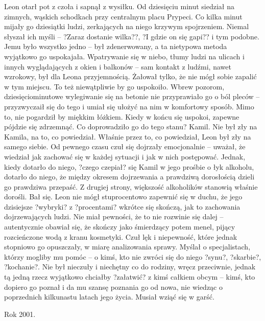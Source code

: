 \documentclass[../MAIN.tex]{subfiles}
\begin{document}
Leon otarł pot z czoła i sapnął z wysiłku.
Od dziesięciu minut siedział na zimnych, wąskich schodkach przy centralnym placu Prypeci. Co kilka minut mijały go dziesiątki ludzi, zerkających na niego krzywym spojrzeniem. Niemal słyszał ich myśli -- ?Zaraz dostanie wilka??, ?I gdzie on się gapi?? i tym podobne. Jemu było wszystko jedno -- był zdenerwowany, a ta nietypowa metoda wyjątkowo go uspokajała. Wpatrywanie się w niebo, tłumy ludzi na ulicach i innych wyglądających z okien i balkonów -- sam kontakt z ludźmi, nawet wzrokowy, był dla Leona przyjemnością.
Żałował tylko, że nie mógł sobie zapalić w tym miejscu. To też niewątpliwie by go uspokoiło.
Wbrew pozorom, dziesięciominutowe wylegiwanie się na betonie nie przyprawiało go o ból pleców -- przyzwyczaił się do tego i umiał się ułożyć na nim w komfortowy sposób. Mimo to, nie pogardził by miękkim łóżkiem. Kiedy w końcu się uspokoi, zapewne pójdzie się zdrzemnąć. Co doprowadziło go do tego stanu?
Kamil.
Nie był zły na Kamila, na to, co powiedział. Właśnie przez to, co powiedział, Leon był zły na samego siebie.
Od pewnego czasu czuł się dojrzały emocjonalnie -- uważał, że wiedział jak zachować się w każdej sytuacji i jak w nich postępować. Jednak, kiedy dotarło do niego, ?czego czepiał? się Kamil w jego prośbie o łyk alkoholu, dotarło do niego, że między okresem dojrzewania a prawdziwą dorosłością dzieli go prawdziwa przepaść.
Z drugiej strony, większość alkoholików stanowią właśnie dorośli.
Bał się.
Leon nie mógł stuprocentowo zapewnić się w duchu, że jego dzisiejsze ?wybryki? z ?procentami? wkrótce się skończą, jak to zachowania dojrzewających ludzi. Nie miał pewności, że to nie rozwinie się dalej -- autentycznie obawiał się, że skończy jako śmierdzący potem menel, pijący rozcieńczone wodą z kranu kosmetyki. Czuł lęk i niepewność, które jednak stopniowo go opuszczały, w miarę analizowania sprawy.
Myślał o specjalistach, którzy mogliby mu pomóc -- o kimś, kto nie zwróci się do niego ?synu?, ?skarbie?, ?kochanie?. Nie był nieczuły i niechętny co do rodziny, wręcz przeciwnie, jednak tą jedną rzecz wyjątkowo chciałby ?załatwić? z kimś całkiem obcym -- kimś, kto dopiero go poznał i da mu szansę poznania go od nowa, nie wiedząc o poprzednich kilkunastu latach jego życia.
Musiał wziąć się w garść.


Rok 2001.
\end{document}
